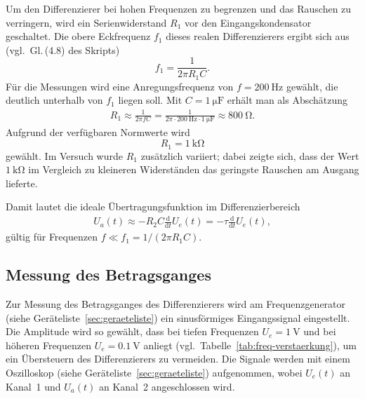 Um den Differenzierer bei hohen Frequenzen zu begrenzen und das Rauschen zu verringern,
wird ein Serienwiderstand $R_1$ vor den Eingangskondensator geschaltet. Die obere
Eckfrequenz $f_1$ dieses realen Differenzierers ergibt sich aus (vgl.\ Gl.\,(4.8) des Skripts)
\begin{equation}
	f_1 = \frac{1}{2\pi R_1 C}.
\end{equation}
Für die Messungen wird eine Anregungsfrequenz von
$f = \SI{200}{\hertz}$
gewählt, die deutlich unterhalb von $f_1$ liegen soll.
Mit $C = \SI{1}{\micro\farad}$ erhält man als Abschätzung
\begin{gather}
	R_1 \approx \frac{1}{2\pi f C}
	= \frac{1}{2\pi \cdot \SI{200}{\hertz} \cdot \SI{1}{\micro\farad}}
	\approx \SI{800}{\ohm}.
\end{gather}
Aufgrund der verfügbaren Normwerte wird
\begin{equation}
	R_1 = \SI{1}{\kilo\ohm}
\end{equation}
gewählt. Im Versuch wurde $R_1$ zusätzlich variiert; dabei zeigte sich, dass der Wert
$\SI{1}{\kilo\ohm}$ im Vergleich zu kleineren Widerständen das geringste Rauschen am
Ausgang lieferte.

Damit lautet die ideale Übertragungsfunktion im Differenzierbereich
\begin{gather}
	U_a(t) \approx - R_2 C \frac{\mathrm{d}}{\mathrm{d}t} U_e(t)
	= - \tau \frac{\mathrm{d}}{\mathrm{d}t} U_e(t),
\end{gather}
gültig für Frequenzen $f \ll f_1 = 1/(2\pi R_1 C)$.

\subsection{Messung des Betragsganges}

Zur Messung des Betragsganges des Differenzierers wird am Frequenzgenerator (siehe Geräteliste~\ref{sec:geraeteliste}) ein sinusförmiges Eingangssignal eingestellt. Die Amplitude wird so gewählt, dass bei tiefen Frequenzen $U_e = \SI{1}{\volt}$ und bei höheren Frequenzen $U_e = \SI{0.1}{\volt}$ anliegt (vgl.\ Tabelle~\ref{tab:freq-verstaerkung}), um ein Übersteuern des Differenzierers zu vermeiden.
Die Signale werden mit einem Oszilloskop (siehe Geräteliste~\ref{sec:geraeteliste}) aufgenommen, wobei
$U_e(t)$ an Kanal~1 und $U_a(t)$ an Kanal~2 angeschlossen wird.

